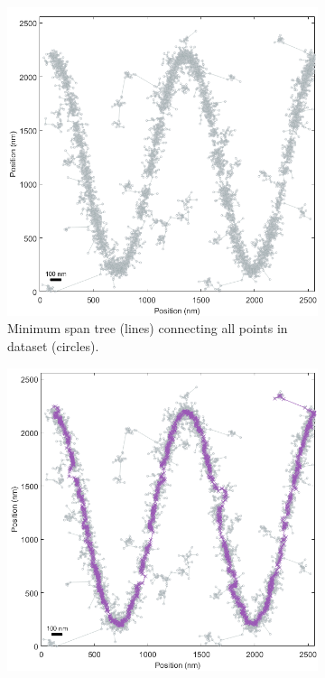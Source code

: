 \documentclass[10pt,a4paper]{article}
\begin{document}
\begin{figure}
	\begin{subfigure}[b]{.45\textwidth}
		\centering
		\includegraphics[width=\textwidth]{./figures/fitgraph.png}
		\caption[Step1]{Minimum span tree (lines) connecting all points in dataset (circles).}
		\label{fig:fitStep1}
	\end{subfigure}
	\hfill
	\begin{subfigure}[b]{0.45\textwidth}
		\centering
		\includegraphics[width=\textwidth]{./figures/fitMinSpan.png}

\end{subfigure}
\end{figure}
\end{document}
